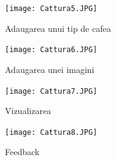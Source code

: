 \begin{figure}[!ht]
	
	\centering
	
	\texttt{[image: Cattura5.JPG]}
	
	\caption{Adaugarea unui tip de cafea}
	
	\label{Im_label}
	
\end{figure}

\begin{figure}[!ht]
	
	\centering
	
	\texttt{[image: Cattura6.JPG]}
	
	\caption{Adaugarea unei imagini}
	
	\label{Im_label}
	
\end{figure}

\begin{figure}[!ht]
	
	\centering
	
	\texttt{[image: Cattura7.JPG]}
	
	\caption{Vizualizarea}
	
	\label{Im_label}
	
\end{figure}

\begin{figure}[!ht]
	
	\centering
	
	\texttt{[image: Cattura8.JPG]}
	
	\caption{Feedback}
	
	\label{Im_label}
	
\end{figure}

\clearpage
        
